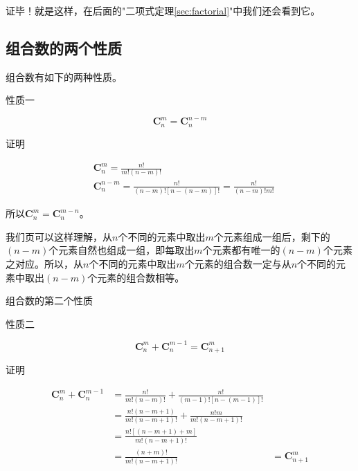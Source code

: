 \documentclass[a5paper]{article}
\begin{document}
证毕！就是这样，在后面的"二项式定理\ref{sec:factorial}"中我们还会看到它。

\subsection{组合数的两个性质}

组合数有如下的两种性质。
\begin{flushleft}{\color{blue} 性质一}\end{flushleft}
\begin{equation}
    \textbf{C}_{n}^{m}=\textbf{C}_{n}^{n-m}
\end{equation}
\begin{flushleft}
	{\color{blue} 证明}
\end{flushleft}
\begin{equation*}
    \begin{aligned}
        &\textbf{C}_{n}^{m} = \frac{n!}{m!(n-m)!} \\
        &\textbf{C}_{n}^{n-m} = \frac{n!}{(n-m)![n-(n-m)]!} = \frac{n!}{(n-m)!m!}
    \end{aligned}
\end{equation*}

所以$\textbf{C}_{n}^{m}=\textbf{C}_{n}^{m-n}$。

我们页可以这样理解，从$n$个不同的元素中取出$m$个元素组成一组后，剩下的$(n-m)$个元素自然也组成一组，即每取出$m$个元素都有唯一的$(n-m)$个元素之对应。所以，从$n$个不同的元素中取出$m$个元素的组合数一定与从$n$个不同的元素中取出$(n-m)$个元素的组合数相等。

组合数的第二个性质
\begin{flushleft}{\color{blue} 性质二}\end{flushleft}
\begin{equation}
    \textbf{C}_{n}^{m}+\textbf{C}_{n}^{m-1}=\textbf{C}_{n+1}^{m}
\end{equation}
\begin{flushleft}
	{\color{blue} 证明}
\end{flushleft}
\begin{equation*}
    \begin{aligned}
        \textbf{C}_{n}^{m}+\textbf{C}_{n}^{m-1} &= \frac{n!}{m!(n-m)!}+\frac{n!}{(m-1)![n-(m-1)]!} \\
        &= \frac{n!(n-m+1)}{m!(n-m+1)!}+\frac{n!m}{m!(n-m+1)!} \\
        &= \frac{n![(n-m+1)+m]}{m!(n-m+1)!} \\
        &= \frac{(n+m)!}{m!(n-m+1)!}
        &= \textbf{C}_{n+1}^{m}
    \end{aligned}
\end{equation*}
\end{document}
